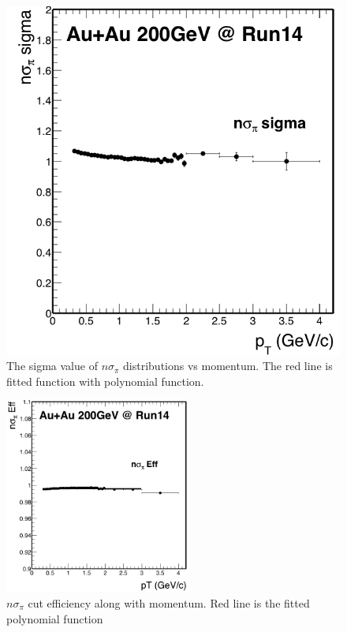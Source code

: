\begin{figure}[htbp]
\begin{minipage}[htbp]{0.5\linewidth}
\centering
\includegraphics[width=1.0\textwidth]{figure/Run14_D0HFT/nSigPion_sigma.png}
\caption{The sigma value of $n\sigma_{\pi}$ distributions vs momentum. The red line is fitted function with polynomial function. \label{fig:pionsigma}}
\end{minipage}
\end{figure}

\begin{figure}[htbp]
\centering
\includegraphics[keepaspectratio,width=0.55\textwidth]{figure/Run14_D0HFT/nSigPion_Eff.png}
\caption{$n\sigma_{\pi}$ cut efficiency along with momentum. Red line is the fitted polynomial function}
\label{fig:pionnsigmaeff}
\end{figure}

